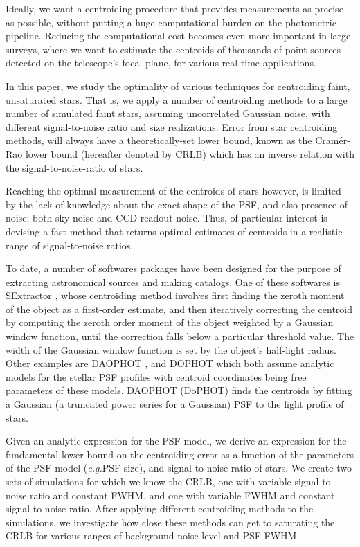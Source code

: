 \documentclass[12pt, preprint]{aastex}
\newcommand{\latin}[1]{\textit{#1}}
\newcommand{\eg}{\latin{e.g.}}
\begin{document}
Ideally, we want a centroiding procedure that provides measurements as precise as possible,
without putting a huge computational burden on the photometric pipeline.
Reducing the computational cost becomes even more important in large surveys,
where we want to estimate the centroids of thousands of point sources detected
on the telescope's focal plane, for various real-time applications.

In this paper, we study the optimality of various techniques for centroiding 
faint, unsaturated stars. That is, we apply a number of centroiding methods 
to a large number of simulated faint stars, assuming uncorrelated Gaussian noise, 
with different signal-to-noise ratio and size realizations. Error from star 
centroiding methods, will always have a theoretically-set lower bound, 
known as the Cram\'{e}r-Rao lower bound (hereafter denoted by CRLB) which 
has an inverse relation with the signal-to-noise-ratio of stars.

Reaching the optimal measurement of the centroids of stars however, is limited
by the lack of knowledge about the exact shape of the PSF, and also presence of noise;
both sky noise and CCD readout noise. Thus, of particular interest is devising a fast method that returns
optimal estimates of centroids in a realistic range of signal-to-noise ratios.

To date, a number of softwares packages have been designed for the purpose of extracting astronomical
sources and making catalogs. One of these softwares is SExtractor \citep{sex},
whose centroiding method involves first finding the zeroth moment of the object
as a first-order estimate, and then iteratively correcting the centroid by computing
the zeroth order moment of the object weighted by a Gaussian window function,
until the correction falls below a particular threshold value.
The width of the Gaussian window function is set by the object's half-light radius.
Other examples are DAOPHOT \citep{daophot}, and DOPHOT \citep{dophot}
which both assume analytic models for the stellar PSF profiles with centroid
coordinates being free parameters of these models.
DAOPHOT (DoPHOT) finds the centroids by fitting a Gaussian (a truncated power series for a Gaussian) PSF to
the light profile of stars.

Given an analytic expression for the PSF model,
we derive an expression for the fundamental lower bound on the centroiding error as
a function of the parameters of the PSF model (\eg PSF size),
and signal-to-noise-ratio of stars. We create two sets of simulations for which we 
know the CRLB, one with variable signal-to-noise ratio and constant FWHM, and one 
with variable FWHM and constant signal-to-noise ratio. After applying
different centroiding methods to the simulations,
we investigate how close these methods can get to saturating the CRLB for
various ranges of background noise level and PSF FWHM.
\end{document}
